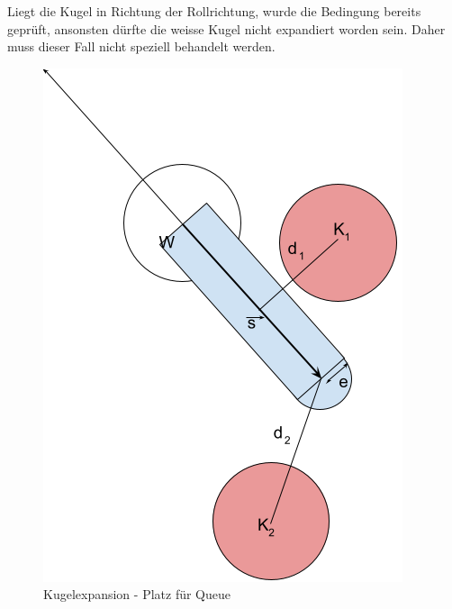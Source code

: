 Liegt die Kugel in Richtung der Rollrichtung, wurde die Bedingung bereits geprüft, ansonsten dürfte die weisse Kugel nicht
expandiert worden sein. Daher muss dieser Fall nicht speziell behandelt werden.

\begin{figure}[h!]
    \begin{center}
        \includegraphics[width=0.4\linewidth]{../common/03_billiard_ai/resources/37_platz_fuer_queue.png}
    \end{center}
    \caption{Kugelexpansion - Platz für Queue}
    \label{fig:kugelexpansion_platz_fuer_queue}
\end{figure}

\newpage
